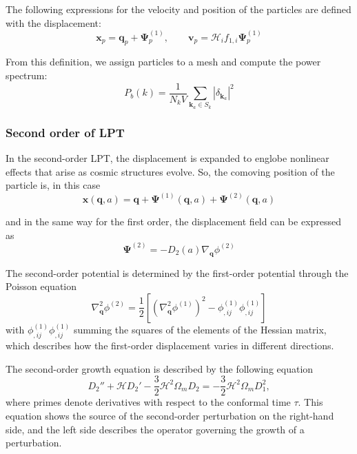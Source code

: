 The following expressions for the velocity and position of the particles are defined with the displacement:
    \begin{equation}
        \mathbf{x}_p = \mathbf{q}_p + \mathbf{\Psi}^{(1)}_p,
        \qquad
        \mathbf{v}_p = \mathcal{H}_i f_{1,i}\mathbf{\Psi}^{(1)}_p
    \end{equation}

From this definition, we assign particles to a mesh and compute the power spectrum:
    \begin{equation}
        P_b(k)=\frac{1}{N_k V}\sum_{\mathbf{k}_a\in S_k}
        \left|\delta_{\mathbf{k}_a}\right|^2
         \label{eq:binned_power_spectrum}
    \end{equation}
    
\subsubsection{Second order of LPT}

In the second-order LPT, the displacement is expanded to englobe nonlinear effects that arise as cosmic structures evolve. So, the comoving position of the particle is, in this case
    \begin{equation}
        \mathbf{x}(\mathbf{q},a)
        =\mathbf{q}+\mathbf{\Psi}^{(1)}(\mathbf{q},a)
        +\mathbf{\Psi}^{(2)}(\mathbf{q},a)
    \end{equation}
    
and in the same way for the first order, the displacement field can be expressed as
    \begin{equation}
        \mathbf{\Psi}^{(2)}=-D_2(a)\nabla_{\mathbf q}\phi^{(2)}
    \end{equation}
    
The second-order potential is determined by the first-order potential through the Poisson equation
    \begin{equation}
        \nabla_{\mathbf q}^{2}\phi^{(2)}
        =\frac12[
        (\nabla_{\mathbf q}^{2}\phi^{(1)})^2
        -\phi^{(1)}_{,ij}\phi^{(1)}_{,ij}]
    \end{equation}
with $\phi^{(1)}_{,ij}\phi^{(1)}_{,ij}$ summing the squares of the elements of the Hessian matrix, which describes how the first-order displacement varies in different directions.

The second-order growth equation is described by the following equation
    \begin{equation}
        D_2''+\mathcal H D_2'
        -\frac32\mathcal H^2\Omega_m D_2
        =-\frac32\mathcal H^2\Omega_m D_1^2,
    \end{equation}
where primes denote derivatives with respect to the conformal time $\tau$. 
This equation shows the source of the second-order perturbation on the right-hand side, and the left side describes the operator governing the growth of a perturbation.
